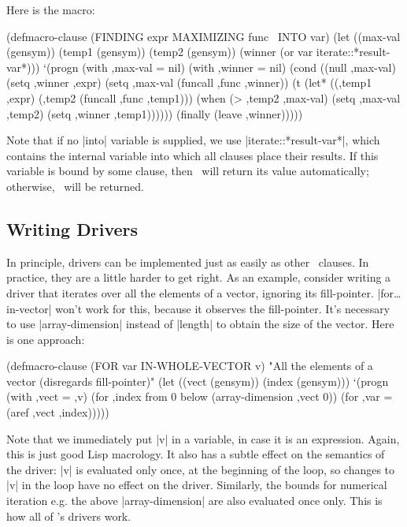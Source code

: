 Here is the macro:
\begin{program}
(defmacro-clause (FINDING expr MAXIMIZING func \opt\ INTO var)
  (let ((max-val (gensym))
        (temp1 (gensym))
        (temp2 (gensym))
        (winner (or var iterate::*result-var*)))
    `(progn 
       (with ,max-val = nil)
       (with ,winner = nil)
       (cond 
        ((null ,max-val)
         (setq ,winner ,expr)
         (setq ,max-val (funcall ,func ,winner))
        (t
         (let* ((,temp1 ,expr)
                (,temp2 (funcall ,func ,temp1)))
           (when (> ,temp2 ,max-val)
             (setq ,max-val ,temp2)
             (setq ,winner ,temp1))))))
       (finally (leave ,winner)))))
\end{program}
Note that if no |into| variable is supplied, we use
|iterate::*result-var*|, which contains the internal variable into
which all clauses place their results.  If this variable is bound by
some clause, then \iter\ will return its value automatically;
otherwise, \nil\ will be returned.  

\subsection{Writing Drivers}

In principle, drivers can be implemented just as easily as other
\iter\ clauses.  In practice, they are a little harder to get right. 
As an example, consider writing a driver that
iterates over all the 
elements of a vector, ignoring its fill-pointer.  |for\dots in-vector|
won't work for this, because it observes the fill-pointer.  It's necessary to
use |array-dimension| instead of |length| to obtain the size of the
vector.  Here is one approach:

\begin{program}
(defmacro-clause (FOR var IN-WHOLE-VECTOR v)
  "All the elements of a vector (disregards fill-pointer)"
  (let ((vect (gensym))
        (index (gensym)))
    `(progn
       (with ,vect = ,v)
       (for ,index from 0 below (array-dimension ,vect 0))
       (for ,var = (aref ,vect ,index)))))
\end{program}
Note that we immediately put |v| in a variable, in case it is an
expression.  Again, this is just good Lisp macrology.  It also has a
subtle effect on the semantics of the driver: |v| is evaluated only
once, at the beginning of the loop, so changes to |v| in the loop have
no effect on the driver.  Similarly, the bounds for numerical iteration
e.g. the above |array-dimension| are also evaluated once only.  This is how
all of \iter's drivers work.


